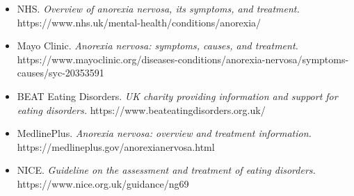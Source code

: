 \begin{itemize}
    \item NHS. \textit{Overview of anorexia nervosa, its symptoms, and treatment.} https://www.nhs.uk/mental-health/conditions/anorexia/
    \item Mayo Clinic. \textit{Anorexia nervosa: symptoms, causes, and treatment.} https://www.mayoclinic.org/diseases-conditions/anorexia-nervosa/symptoms-causes/syc-20353591
    \item BEAT Eating Disorders. \textit{UK charity providing information and support for eating disorders.} https://www.beateatingdisorders.org.uk/
    \item MedlinePlus. \textit{Anorexia nervosa: overview and treatment information.} https://medlineplus.gov/anorexianervosa.html
    \item NICE. \textit{Guideline on the assessment and treatment of eating disorders.} https://www.nice.org.uk/guidance/ng69
\end{itemize}
